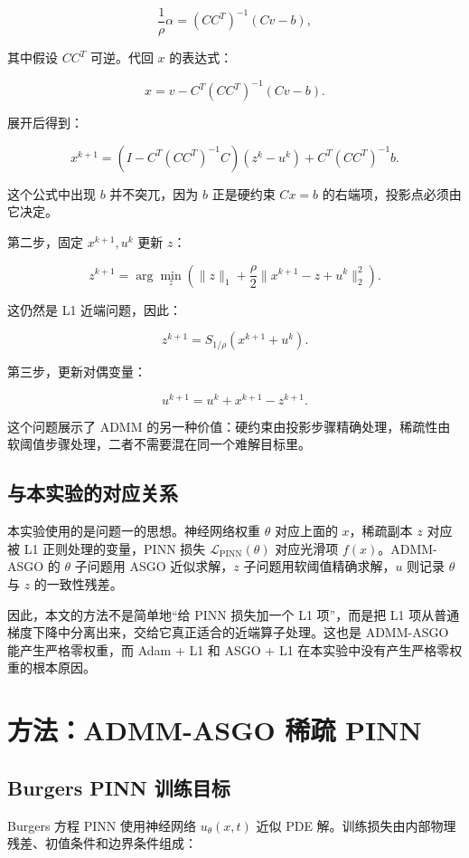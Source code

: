 \documentclass[UTF8,a4paper,12pt,fontset=none]{ctexart}
\begin{document}
\[
\frac{1}{\rho}\alpha=(CC^T)^{-1}(Cv-b),
\]

其中假设 $CC^T$ 可逆。代回 $x$ 的表达式：

\[
x=v-C^T(CC^T)^{-1}(Cv-b).
\]

展开后得到：

\[
x^{k+1}=\left(I-C^T(CC^T)^{-1}C\right)(z^k-u^k)+C^T(CC^T)^{-1}b.
\]

这个公式中出现 $b$ 并不突兀，因为 $b$ 正是硬约束 $Cx=b$ 的右端项，投影点必须由它决定。

第二步，固定 $x^{k+1},u^k$ 更新 $z$：

\[
z^{k+1}=\arg\min_z\left(\|z\|_1+\frac{\rho}{2}\|x^{k+1}-z+u^k\|_2^2\right).
\]

这仍然是 L1 近端问题，因此：

\[
z^{k+1}=S_{1/\rho}(x^{k+1}+u^k).
\]

第三步，更新对偶变量：

\[
u^{k+1}=u^k+x^{k+1}-z^{k+1}.
\]

这个问题展示了 ADMM 的另一种价值：硬约束由投影步骤精确处理，稀疏性由软阈值步骤处理，二者不需要混在同一个难解目标里。

\subsection{与本实验的对应关系}

本实验使用的是问题一的思想。神经网络权重 $\theta$ 对应上面的 $x$，稀疏副本 $z$ 对应被 L1 正则处理的变量，PINN 损失 $\mathcal L_{\mathrm{PINN}}(\theta)$ 对应光滑项 $f(x)$。ADMM-ASGO 的 $\theta$ 子问题用 ASGO 近似求解，$z$ 子问题用软阈值精确求解，$u$ 则记录 $\theta$ 与 $z$ 的一致性残差。

因此，本文的方法不是简单地“给 PINN 损失加一个 L1 项”，而是把 L1 项从普通梯度下降中分离出来，交给它真正适合的近端算子处理。这也是 ADMM-ASGO 能产生严格零权重，而 Adam + L1 和 ASGO + L1 在本实验中没有产生严格零权重的根本原因。

\section{方法：ADMM-ASGO 稀疏 PINN}

\subsection{Burgers PINN 训练目标}

Burgers 方程 PINN 使用神经网络 $u_\theta(x,t)$ 近似 PDE 解。训练损失由内部物理残差、初值条件和边界条件组成：
\end{document}
